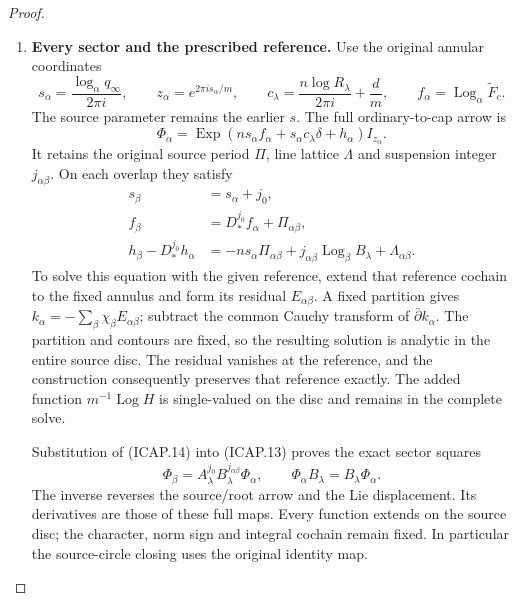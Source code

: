 \begin{proof}
\begin{enumerate}[label=\arabic*.]
\item \textbf{Every sector and the prescribed reference.}
Use the original annular coordinates
\[
 s_\alpha=\frac{\log_\alpha q_\infty}{2\pi i},\qquad
 z_\alpha=e^{2\pi i s_\alpha/m},\qquad
 c_\lambda=\frac{n\log R_\lambda}{2\pi i}+\frac dm,
 \qquad f_\alpha=\operatorname{Log}_\alpha\widetilde F_c.
\]
The source parameter remains the earlier \(s\).
The full ordinary-to-cap arrow is
\[
 \Phi_\alpha=\operatorname{Exp}
 (n s_\alpha f_\alpha+s_\alpha c_\lambda\delta+h_\alpha)
 I_{z_\alpha}.                                         \tag{ICAP.13}
\]
It retains the original source period \(\Pi\), line lattice
\(\Lambda\) and suspension integer \(j_{\alpha\beta}\).
On each overlap they satisfy
\[
\begin{aligned}
 s_\beta&=s_\alpha+j_0,\\
 f_\beta&=D_*^{j_0}f_\alpha+\Pi_{\alpha\beta},\\
 h_\beta-D_*^{j_0}h_\alpha
 &=-n s_\alpha\Pi_{\alpha\beta}
   +j_{\alpha\beta}\operatorname{Log}_\beta B_\lambda
   +\Lambda_{\alpha\beta}.
\end{aligned}                                          \tag{ICAP.14}
\]
To solve this equation with the given reference, extend that
reference cochain to the fixed annulus and form its residual
\(E_{\alpha\beta}\). A fixed partition gives
\(k_\alpha=-\sum_\beta\chi_\beta E_{\alpha\beta}\);
subtract the common Cauchy transform of \(\bar\partial k_\alpha\).
The partition and contours are fixed, so the resulting solution
is analytic in the entire source disc. The residual vanishes
at the reference, and the construction consequently preserves
that reference exactly. The added function
\(m^{-1}\operatorname{Log}H\) is single-valued on the disc
and remains in the complete solve.

Substitution of (ICAP.14) into (ICAP.13) proves the exact
sector squares
\[
 \Phi_\beta=A_\lambda^{j_0}B_\lambda^{j_{\alpha\beta}}
                 \Phi_\alpha,\qquad
 \Phi_\alpha B_\lambda=B_\lambda\Phi_\alpha.
 \tag{ICAP.15}
\]
The inverse reverses the source/root arrow and the Lie
displacement. Its derivatives are those of these full maps.
Every function extends on the source disc; the character,
norm sign and integral cochain remain fixed. In particular the
source-circle closing uses the original identity map.


\end{enumerate}
\end{proof}
